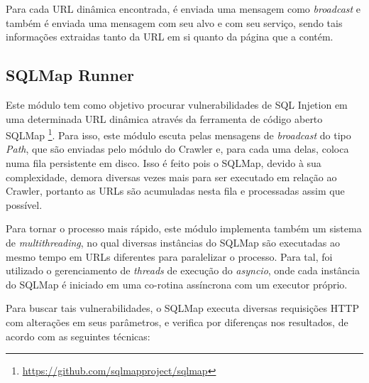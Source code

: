     Para cada URL dinâmica encontrada, é enviada uma mensagem como \textit{broadcast} e também é enviada uma mensagem com seu alvo e com seu serviço, sendo tais informações extraidas tanto da URL em si quanto da página que a contém.
    
    \subsection{SQLMap Runner}
    Este módulo tem como objetivo procurar vulnerabilidades de SQL Injetion em uma determinada URL dinâmica através da ferramenta de código aberto SQLMap \footnote{\url{https://github.com/sqlmapproject/sqlmap}}. Para isso, este módulo escuta pelas mensagens de \textit{broadcast} do tipo \textit{Path}, que são enviadas pelo módulo do Crawler e, para cada uma delas, coloca numa fila persistente em disco. Isso é feito pois o SQLMap, devido à sua complexidade, demora diversas vezes mais para ser executado em relação ao Crawler, portanto as URLs são acumuladas nesta fila e processadas assim que possível.
    
    Para tornar o processo mais rápido, este módulo implementa também um sistema de \textit{multithreading}, no qual diversas instâncias do SQLMap são executadas ao mesmo tempo em URLs diferentes para paralelizar o processo. Para tal, foi utilizado o gerenciamento de \textit{threads} de execução do \textit{asyncio}, onde cada instância do SQLMap é iniciado em uma co-rotina assíncrona com um executor próprio.
    
    Para buscar tais vulnerabilidades, o SQLMap executa diversas requisições HTTP com alterações em seus parâmetros, e verifica por diferenças nos resultados, de acordo com as seguintes técnicas:
    
